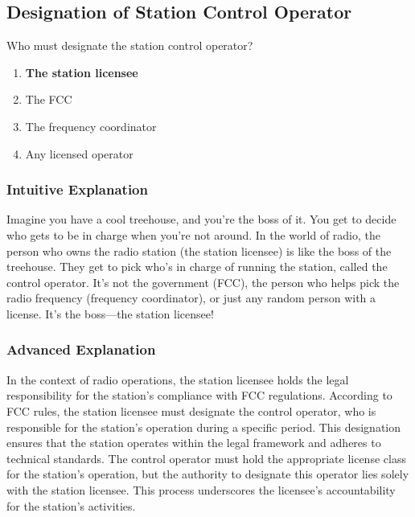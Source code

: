 \subsection{Designation of Station Control Operator}
\label{T1E03}

\begin{tcolorbox}[colback=gray!10!white,colframe=black!75!black,title=T1E03]
Who must designate the station control operator?
\begin{enumerate}[label=\Alph*.]
    \item \textbf{The station licensee}
    \item The FCC
    \item The frequency coordinator
    \item Any licensed operator
\end{enumerate}
\end{tcolorbox}

\subsubsection{Intuitive Explanation}
Imagine you have a cool treehouse, and you’re the boss of it. You get to decide who gets to be in charge when you’re not around. In the world of radio, the person who owns the radio station (the station licensee) is like the boss of the treehouse. They get to pick who’s in charge of running the station, called the control operator. It’s not the government (FCC), the person who helps pick the radio frequency (frequency coordinator), or just any random person with a license. It’s the boss—the station licensee!

\subsubsection{Advanced Explanation}
In the context of radio operations, the station licensee holds the legal responsibility for the station’s compliance with FCC regulations. According to FCC rules, the station licensee must designate the control operator, who is responsible for the station’s operation during a specific period. This designation ensures that the station operates within the legal framework and adheres to technical standards. The control operator must hold the appropriate license class for the station’s operation, but the authority to designate this operator lies solely with the station licensee. This process underscores the licensee’s accountability for the station’s activities.